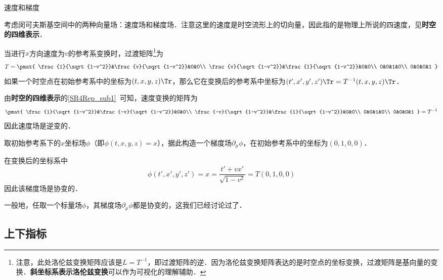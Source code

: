 \begin{example}{速度和梯度}

考虑闵可夫斯基空间中的两种向量场：速度场和梯度场．注意这里的速度是时空流形上的切向量，因此指的是物理上所说的四速度，见\textbf{时空的四维表示}．

当进行$x$方向速度为$v$的参考系变换时，过渡矩阵\footnote{注意，此处洛伦兹变换矩阵应该是$L=T^{-1}$，即过渡矩阵的逆．因为洛伦兹变换矩阵表达的是时空点的坐标变换，过渡矩阵是基向量的变换．\textbf{斜坐标系表示洛伦兹变换}可以作为可视化的理解辅助．}为
\begin{equation}
T=
\pmat{
    \frac{1}{\sqrt{1-v^2}}&\frac{v}{\sqrt{1-v^2}}&0&0\\
    \frac{v}{\sqrt{1-v^2}}&\frac{1}{\sqrt{1-v^2}}&0&0\\
    0&0&1&0\\
    0&0&0&1
}
\end{equation}
如果一个时空点在初始参考系中的坐标为$(t, x, y, z)\Tr$，那么它在变换后的参考系中坐标为$(t', x', y', z')\Tr=T^{-1}(t, x, y, z)\Tr$．


由\textbf{时空的四维表示}的\autoref{SR4Rep_sub1}~可知，速度变换的矩阵为
\begin{equation}
\pmat{
    \frac{1}{\sqrt{1-v^2}}&\frac{-v}{\sqrt{1-v^2}}&0&0\\
    \frac{-v}{\sqrt{1-v^2}}&\frac{1}{\sqrt{1-v^2}}&0&0\\
    0&0&1&0\\
    0&0&0&1
}
=T^{-1}
\end{equation}
因此速度场是逆变的．

取初始参考系下的$x$坐标场$\phi$（即$\phi(t, x, y, z)=x$），据此构造一个梯度场$\partial_\mu \phi$，在初始参考系中的坐标为$(0, 1, 0, 0)$．

在变换后的坐标系中
\begin{equation}
\phi(t', x', y', z')=x=\frac{t'+vx'}{\sqrt{1-v^2}}=T(0, 1, 0, 0)
\end{equation}
因此该梯度场是协变的．

一般地，任取一个标量场$\phi$，其梯度场$\partial_\mu\phi$都是协变的，这我们已经讨论过了．

\end{example}




\subsection{上下指标}

